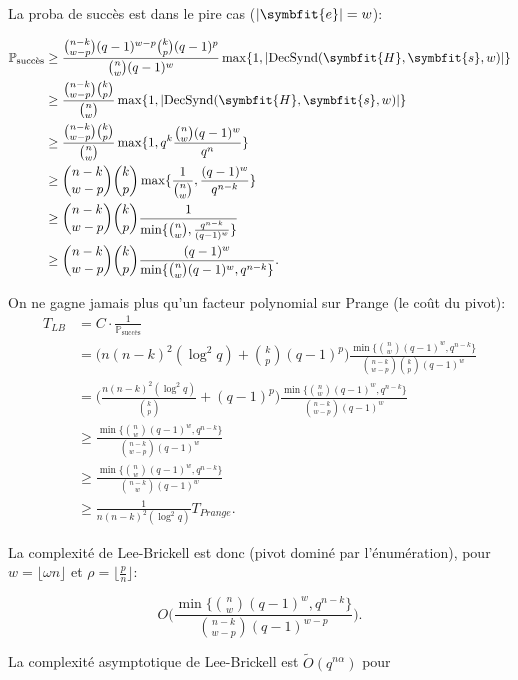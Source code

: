 \documentclass{scrartcl}[a4paper,9pt,headings=small,footinclude=false]
\theoremstyle{definition}
\theoremstyle{remark}
\begin{document}
La proba de succès est dans le pire cas ($|\symbfit{e}|=w$):

\begin{align*}
\mathbb{P}_{\text{succès}} &\geq  \frac{\binom{n-k}{w-p}(q-1)^{w-p} \binom{k}{p}(q-1)^{p}}{\binom{n}{w}(q-1)^w} \max \{ 1, |\text{DecSynd}(\symbfit{H},\symbfit{s},w)|\}\\
&\geq  \frac{\binom{n-k}{w-p} \binom{k}{p}}{\binom{n}{w}} \max \{ 1, |\text{DecSynd}(\symbfit{H},\symbfit{s},w)|\}\\
&\geq  \frac{\binom{n-k}{w-p} \binom{k}{p}}{\binom{n}{w}} \max \{ 1, q^k \frac{\binom{n}{w}(q-1)^w}{q^n}\}\\
&\geq  \binom{n-k}{w-p} \binom{k}{p} \max \{ \frac{1}{\binom{n}{w}}, \frac{(q-1)^w}{q^{n-k}}\}\\
&\geq  \binom{n-k}{w-p} \binom{k}{p} \frac{1}{\min \{ \binom{n}{w}, \frac{q^{n-k}}{(q-1)^w}\}}\\
&\geq  \binom{n-k}{w-p} \binom{k}{p} \frac{(q-1)^w}{\min \{ \binom{n}{w}(q-1)^w, q^{n-k}\}}.
\end{align*}

On ne gagne jamais plus qu'un facteur polynomial sur Prange (le coût du pivot):
\begin{align*}
T_{LB} &= C\cdot \frac{1}{\mathbb{P}_{\text{succès}}}\\
&=\Bigg(n(n-k)^2(\log^2 q) + \binom{k}{p}(q-1)^p\Bigg)  \frac{\min \{ \binom{n}{w}(q-1)^w, q^{n-k}\}}{\binom{n-k}{w-p} \binom{k}{p}(q-1)^w}\\
&=\Bigg(\frac{n(n-k)^2(\log^2 q)}{\binom{k}{p}} +(q-1)^p\Bigg)  \frac{\min \{ \binom{n}{w}(q-1)^w, q^{n-k}\}}{\binom{n-k}{w-p} (q-1)^w}\\
&\geq \frac{\min \{ \binom{n}{w}(q-1)^w, q^{n-k}\}}{\binom{n-k}{w-p} (q-1)^w}\\
&\geq \frac{\min \{ \binom{n}{w}(q-1)^w, q^{n-k}\}}{\binom{n-k}{w} (q-1)^w}\\
&\geq \frac{1}{n(n-k)^2(\log^2 q)} T_{Prange}.
\end{align*}

La complexité de Lee-Brickell est donc (pivot dominé par l'énumération), pour $w=\lfloor \omega n \rfloor$ et $\rho=\lfloor \frac{p}{n} \rfloor$:

\[
	O\Bigg(\frac{\min \{ \binom{n}{w}(q-1)^w, q^{n-k}\}}{\binom{n-k}{w-p} (q-1)^{w-p}}\Bigg).
\]

La complexité asymptotique de Lee-Brickell est $\tilde{O}(q^{n\alpha})$ pour
\end{document}
